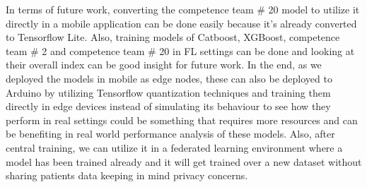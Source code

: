 In terms of future work, converting the competence team \# 20 model to utilize it directly in a mobile application can be done easily because it's already converted to Tensorflow Lite. Also, training models of Catboost, XGBoost, competence team \# 2 and competence team \# 20 in FL settings can be done and looking at their overall index can be good insight for future work. In the end, as we deployed the models in mobile as edge nodes, these can also be deployed to Arduino by utilizing Tensorflow quantization techniques and training them directly in edge devices instead of simulating its behaviour to see how they perform in real settings could be something that requires more resources and can be benefiting in real world performance analysis of these models. Also, after central training, we can utilize it in a federated learning environment where a model has been trained already and it will get trained over a new dataset without sharing patients data keeping in mind privacy concerns. 

